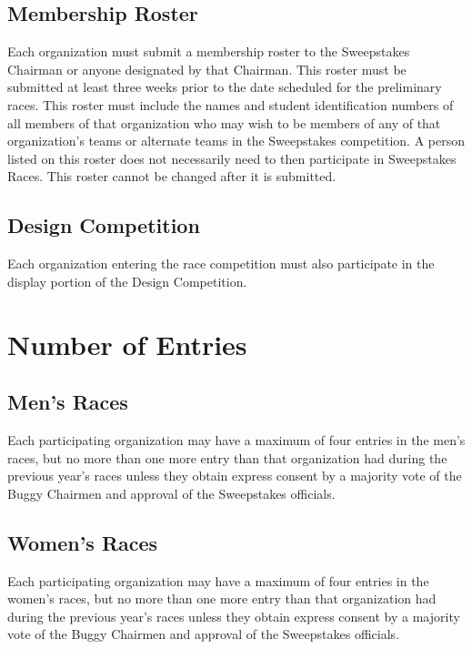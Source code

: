 \subsection{Membership Roster}

	Each organization must submit a membership roster to the Sweepstakes Chairman
	or anyone designated by that Chairman. This roster must be submitted at least
	three weeks prior to the date scheduled for the preliminary races. This roster
	must include the names and student identification numbers of all members of
	that organization who may wish to be members of any of that organization's
	teams or alternate teams in the Sweepstakes competition. A person listed on
	this roster does not necessarily need to then participate in Sweepstakes Races.
	This roster cannot be changed after it is submitted.

\subsection{Design Competition}

	Each organization entering the race competition must also participate in the
	display portion of the Design Competition.

\section{Number of Entries}

\subsection{Men's Races}

	Each participating organization may have a maximum of four entries in the men's
	races, but no more than one more entry than that organization had during the
	previous year's races unless they obtain express consent by a majority vote of
	the Buggy Chairmen and approval of the Sweepstakes officials.

\subsection{Women's Races}

	Each participating organization may have a maximum of four entries in the
	women's races, but no more than one more entry than that organization had
	during the previous year's races unless they obtain express consent by a
	majority vote of the Buggy Chairmen and approval of the Sweepstakes officials.

